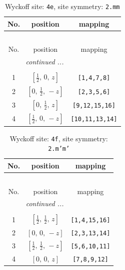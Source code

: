 \documentclass[fleqn,8pt]{jsarticle}
\begin{document}
\begin{longtable}{ccc}
\caption{Wyckoff site: {\tt 4e}, site symmetry: {\tt 2.mm}}
 \\
 \hline \hline
No. & position & mapping \\ \hline \endfirsthead

\multicolumn{2}{l}{\tablename\ \thetable{}} \\
 \hline \hline
No. & position & mapping \\ \hline \endhead

 \hline \hline
\multicolumn{2}{r}{\footnotesize\it continued ...} \\ \endfoot

 \hline \hline
\multicolumn{2}{r}{} \\ \endlastfoot

1 & $\left[ \frac{1}{2},\, 0,\, z \right]$ & {\tt [1,4,7,8]} \\ \hline
2 & $\left[ 0,\, \frac{1}{2},\, - z \right]$ & {\tt [2,3,5,6]} \\ \hline
3 & $\left[ 0,\, \frac{1}{2},\, z \right]$ & {\tt [9,12,15,16]} \\ \hline
4 & $\left[ \frac{1}{2},\, 0,\, - z \right]$ & {\tt [10,11,13,14]} \\
\end{longtable}
\renewcommand{\arraystretch}{1.2}
\begin{longtable}{ccc}
\caption{Wyckoff site: {\tt 4f}, site symmetry: {\tt 2.m'm'}}
 \\
 \hline \hline
No. & position & mapping \\ \hline \endfirsthead

\multicolumn{2}{l}{\tablename\ \thetable{}} \\
 \hline \hline
No. & position & mapping \\ \hline \endhead

 \hline \hline
\multicolumn{2}{r}{\footnotesize\it continued ...} \\ \endfoot

 \hline \hline
\multicolumn{2}{r}{} \\ \endlastfoot

1 & $\left[ \frac{1}{2},\, \frac{1}{2},\, z \right]$ & {\tt [1,4,15,16]} \\ \hline
2 & $\left[ 0,\, 0,\, - z \right]$ & {\tt [2,3,13,14]} \\ \hline
3 & $\left[ \frac{1}{2},\, \frac{1}{2},\, - z \right]$ & {\tt [5,6,10,11]} \\ \hline
4 & $\left[ 0,\, 0,\, z \right]$ & {\tt [7,8,9,12]} \\
\end{longtable}
\end{document}
